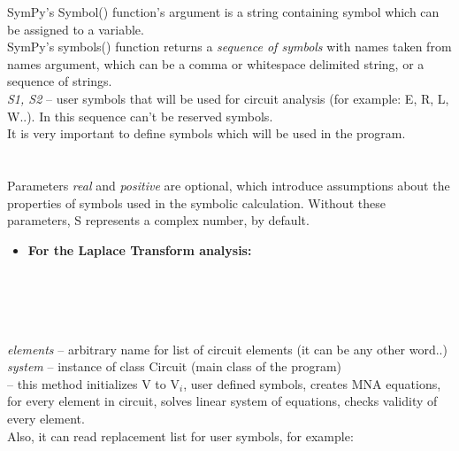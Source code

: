 \documentclass[11pt]{article}
\begin{document}
SymPy's Symbol() function's argument is a string containing symbol
which can be assigned to a variable.\\
SymPy's symbols() function returns a \emph{sequence of symbols} with
names taken from names argument, which can be a comma or whitespace
delimited string, or a sequence of strings.\\
\emph{S1, S2} \textrm{--} user symbols that will be used for circuit analysis (for
example: E, R, L, W..). In this sequence can't be reserved symbols.\\
It is very important to define symbols which will be used in the
program.\\

\\
~\\

Parameters \emph{real} and \emph{positive} are optional, which
introduce assumptions about the properties of symbols used in the
symbolic calculation. Without these parameters, S represents a complex
number, by default.\\

\begin{itemize}
\item
  \textbf{For the Laplace Transform analysis:}
\end{itemize}

\\
\\
\\
\\

\emph{elements} \textrm{--} arbitrary name for list of circuit elements (it can
be any other word..)\\
\emph{system} \textrm{--} instance of class Circuit (main class of the program)\\
 \textrm{--} this method initializes V to V\(_{i}\), user
defined symbols, creates MNA equations, for every element in circuit,
solves linear system of equations, checks validity of every
element.\\[1.3ex]
Also, it can read replacement list for user symbols, for example:
\end{document}
